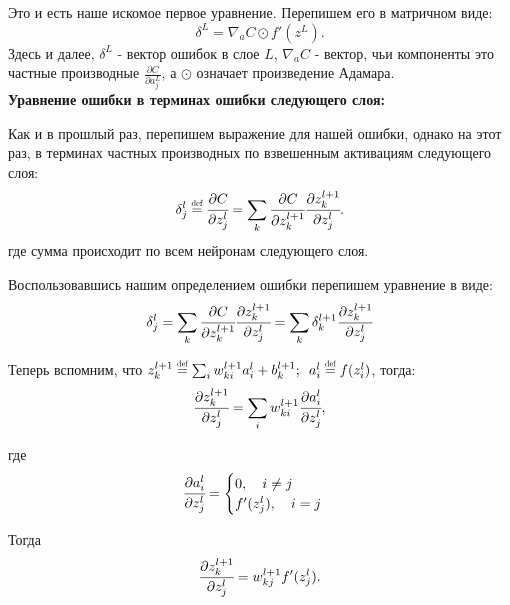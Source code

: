 Это и есть наше искомое первое уравнение. Перепишем его в матричном виде:
\begin{equation}
    \delta^L = \nabla_a C \odot f'(z^L).
    \tag{I}
\end{equation}
Здесь и далее, $\delta^L$ - вектор ошибок в слое $L$, 
$\nabla_a C$ - вектор, чьи компоненты это частные производные 
$\frac{\partial C}{\partial a_j^L}$, а $\odot$ означает произведение Адамара.\\

\noindent\textbf{Уравнение ошибки в терминах ошибки следующего слоя:}

Как и в прошлый раз, перепишем выражение для нашей ошибки, однако на этот раз, 
в терминах частных производных по взвешенным активациям следующего слоя:
\begin{equation*}
    \delta_j^l \defeq \cfrac{\partial C}{\partial z_j^l} = 
    \sum_k \cfrac{\partial C}{\partial z_k^{l+1}} \cfrac{\partial z_k^{l+1}}{\partial z_j^l}.
\end{equation*}
где сумма происходит по всем нейронам следующего слоя. 

Воспользовавшись нашим определением ошибки перепишем уравнение в виде:
\begin{equation}
    \delta_j^l = 
    \sum_k \cfrac{\partial C}{\partial z_k^{l+1}} \cfrac{\partial z_k^{l+1}}{\partial z_j^l} = 
    \sum_k \delta_k^{l+1} \cfrac{\partial z_k^{l+1}}{\partial z_j^l}
\end{equation}

Теперь вспомним, что $z_k^{l+1} \defeq \sum_i w_{ki}^{l+1} a_i^l + b_k^{l+1};\hspace{5pt} a_i^l \defeq f(z_i^l)$, тогда:
\begin{equation*}
    \cfrac{\partial z_k^{l+1}}{\partial z_j^l} = \sum_i w_{ki}^{l+1} \cfrac{\partial a_i^l}{\partial z_j^l},
\end{equation*}

где 
\begin{equation*}
    \cfrac{\partial a_i^l}{\partial z_j^l} = \begin{cases}
        0, \quad i \neq j \\
        f'(z_j^l), \quad i = j
    \end{cases}
\end{equation*}

Тогда
\begin{equation*}
    \cfrac{\partial z_k^{l+1}}{\partial z_j^l} = w_{kj}^{l+1} f'(z_j^l).
\end{equation*}

